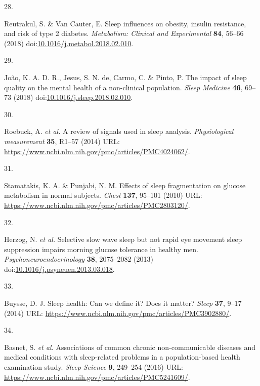 \documentclass[
  10pt,
]{scrbook}
\newlength{\cslhangindent}
\newlength{\csllabelwidth}
\newlength{\cslentryspacingunit} %
\newenvironment{CSLReferences}[2] %
 {%
  \setlength{\parindent}{0pt}
  \ifodd #1
  \let\oldpar\par
  \def\par{\hangindent=\cslhangindent\oldpar}
  \fi
  \setlength{\parskip}{#2\cslentryspacingunit}
 }%
 {}
\newcommand{\CSLLeftMargin}[1]{\parbox[t]{\csllabelwidth}{#1}}
\newcommand{\CSLRightInline}[1]{\parbox[t]{\linewidth - \csllabelwidth}{#1}\break}
\begin{document}
\begin{CSLReferences}{0}{0}
\leavevmode{}%
\CSLLeftMargin{28. }%
\CSLRightInline{Reutrakul, S. \& Van Cauter, E. Sleep influences on
obesity, insulin resistance, and risk of type 2 diabetes.
\emph{Metabolism: Clinical and Experimental} \textbf{84}, 56--66 (2018)
doi:\href{https://doi.org/10.1016/j.metabol.2018.02.010}{10.1016/j.metabol.2018.02.010}.}

\leavevmode{}%
\CSLLeftMargin{29. }%
\CSLRightInline{João, K. A. D. R., Jesus, S. N. de, Carmo, C. \& Pinto,
P. The impact of sleep quality on the mental health of a non-clinical
population. \emph{Sleep Medicine} \textbf{46}, 69--73 (2018)
doi:\href{https://doi.org/10.1016/j.sleep.2018.02.010}{10.1016/j.sleep.2018.02.010}.}

\leavevmode{}%
\CSLLeftMargin{30. }%
\CSLRightInline{Roebuck, A. \emph{et al.} A review of signals used in
sleep analysis. \emph{Physiological measurement} \textbf{35}, R1--57
(2014) URL:
\url{https://www.ncbi.nlm.nih.gov/pmc/articles/PMC4024062/}.}

\leavevmode{}%
\CSLLeftMargin{31. }%
\CSLRightInline{Stamatakis, K. A. \& Punjabi, N. M. Effects of sleep
fragmentation on glucose metabolism in normal subjects. \emph{Chest}
\textbf{137}, 95--101 (2010) URL:
\url{https://www.ncbi.nlm.nih.gov/pmc/articles/PMC2803120/}.}

\leavevmode{}%
\CSLLeftMargin{32. }%
\CSLRightInline{Herzog, N. \emph{et al.} Selective slow wave sleep but
not rapid eye movement sleep suppression impairs morning glucose
tolerance in healthy men. \emph{Psychoneuroendocrinology} \textbf{38},
2075--2082 (2013)
doi:\href{https://doi.org/10.1016/j.psyneuen.2013.03.018}{10.1016/j.psyneuen.2013.03.018}.}

\leavevmode{}%
\CSLLeftMargin{33. }%
\CSLRightInline{Buysse, D. J. Sleep health: Can we define it? Does it
matter? \emph{Sleep} \textbf{37}, 9--17 (2014) URL:
\url{https://www.ncbi.nlm.nih.gov/pmc/articles/PMC3902880/}.}

\leavevmode{}%
\CSLLeftMargin{34. }%
\CSLRightInline{Basnet, S. \emph{et al.} Associations of common chronic
non-communicable diseases and medical conditions with sleep-related
problems in a population-based health examination study. \emph{Sleep
Science} \textbf{9}, 249--254 (2016) URL:
\url{https://www.ncbi.nlm.nih.gov/pmc/articles/PMC5241609/}.}


\end{CSLReferences}
\end{document}
